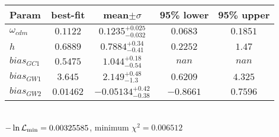 \begin{tabular}{|l|c|c|c|c|} 
 \hline 
Param & best-fit & mean$\pm\sigma$ & 95\% lower & 95\% upper \\ \hline 
$\omega_{cdm }$ &$0.1122$ & $0.1235_{-0.032}^{+0.025}$ & $0.0683$ & $0.1851$ \\ 
$h$ &$0.6889$ & $0.7884_{-0.41}^{+0.34}$ & $0.2252$ & $1.47$ \\ 
$bias_{GC 1 }$ &$0.5475$ & $1.044_{-0.54}^{+0.18}$ & $nan$ & $nan$ \\ 
$bias_{GW 1 }$ &$3.645$ & $2.149_{-1.3}^{+0.48}$ & $0.6209$ & $4.325$ \\ 
$bias_{GW 2 }$ &$0.01462$ & $-0.05134_{-0.38}^{+0.42}$ & $-0.8661$ & $0.7596$ \\ 
\hline 
 \end{tabular} \\ 
$-\ln{\cal L}_\mathrm{min} =0.00325585$, minimum $\chi^2=0.006512$ \\ 
